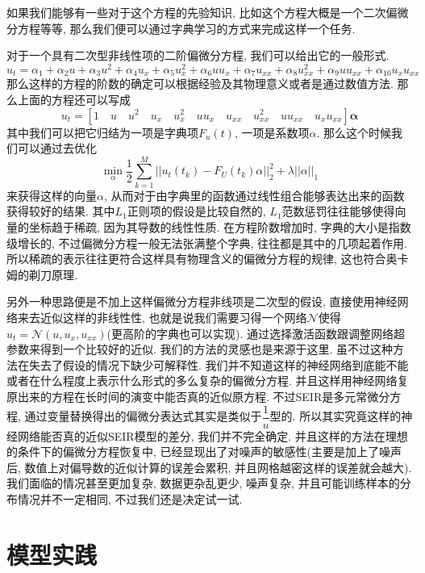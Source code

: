 \documentclass[lang=cn,11pt]{elegantpaper}
\begin{document}
如果我们能够有一些对于这个方程的先验知识, 比如这个方程大概是一个二次偏微分方程等等, 那么我们便可以通过字典学习的方式来完成这样一个任务.

对于一个具有二次型非线性项的二阶偏微分方程, 我们可以给出它的一般形式.
\large
\begin{equation}
	u_t=\alpha_1+\alpha_2u+\alpha_3u^2+\alpha_4u_x+\alpha_5u_x^2+\alpha_6uu_x+\alpha_7u_{xx}+\alpha_8u_{xx}^2+\alpha_9uu_{xx}+\alpha_{10}u_xu_{xx}
\end{equation}
\normalsize
那么这样的方程的阶数的确定可以根据经验及其物理意义或者是通过数值方法. 那么上面的方程还可以写成
\large
\begin{equation}
	u_t=[1\quad u\quad u^2\quad u_x\quad u_x^2\quad uu_x\quad u_{xx}\quad u_{xx}^2\quad uu_{xx}\quad u_xu_{xx}] \mathbf \alpha
\end{equation}
\normalsize
其中我们可以把它归结为一项是字典项$F_u(t)$, 一项是系数项$\alpha$. 那么这个时候我们可以通过去优化
\large
\begin{equation}
	\min_\alpha \dfrac{1}{2}\sum_{k=1}^M ||u_t(t_k)-F_U(t_k)\alpha||_2^2+\lambda||\alpha||_1
\end{equation}
\normalsize
来获得这样的向量$\alpha$, 从而对于由字典里的函数通过线性组合能够表达出来的函数获得较好的结果. 其中$L_1$正则项的假设是比较自然的, $L_1$范数惩罚往往能够使得向量的坐标趋于稀疏, 因为其导数的线性性质. 在方程阶数增加时, 字典的大小是指数级增长的, 不过偏微分方程一般无法张满整个字典, 往往都是其中的几项起着作用. 所以稀疏的表示往往更符合这样具有物理含义的偏微分方程的规律, 这也符合奥卡姆的剃刀原理.

另外一种思路便是不加上这样偏微分方程非线项是二次型的假设, 直接使用神经网络来去近似这样的非线性性, 也就是说我们需要习得一个网络$\mathcal N$使得$u_t=\mathcal N(u,u_x,u_{xx})$(更高阶的字典也可以实现). 通过选择激活函数跟调整网络超参数来得到一个比较好的近似. 我们的方法的灵感也是来源于这里. 虽不过这种方法在失去了假设的情况下缺少可解释性. 我们并不知道这样的神经网络到底能不能或者在什么程度上表示什么形式的多么复杂的偏微分方程. 并且这样用神经网络复原出来的方程在长时间的演变中能否真的近似原方程. 不过SEIR是多元常微分方程, 通过变量替换得出的偏微分表达式其实是类似于$\dfrac{1}{u}$型的. 所以其实究竟这样的神经网络能否真的近似SEIR模型的差分, 我们并不完全确定. 并且这样的方法在理想的条件下的偏微分方程恢复中, 已经显现出了对噪声的敏感性(主要是加上了噪声后, 数值上对偏导数的近似计算的误差会累积, 并且网格越密这样的误差就会越大). 我们面临的情况甚至更加复杂, 数据更杂乱更少, 噪声复杂, 并且可能训练样本的分布情况并不一定相同, 不过我们还是决定试一试.


\section{模型实践}
\end{document}
